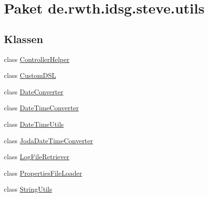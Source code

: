 \hypertarget{namespacede_1_1rwth_1_1idsg_1_1steve_1_1utils}{\section{Paket de.\-rwth.\-idsg.\-steve.\-utils}
\label{namespacede_1_1rwth_1_1idsg_1_1steve_1_1utils}
}
\subsection*{Klassen}
\begin{DoxyCompactItemize}
\item 
class \hyperlink{classde_1_1rwth_1_1idsg_1_1steve_1_1utils_1_1_controller_helper}{Controller\-Helper}
\item 
class \hyperlink{classde_1_1rwth_1_1idsg_1_1steve_1_1utils_1_1_custom_d_s_l}{Custom\-D\-S\-L}
\item 
class \hyperlink{classde_1_1rwth_1_1idsg_1_1steve_1_1utils_1_1_date_converter}{Date\-Converter}
\item 
class \hyperlink{classde_1_1rwth_1_1idsg_1_1steve_1_1utils_1_1_date_time_converter}{Date\-Time\-Converter}
\item 
class \hyperlink{classde_1_1rwth_1_1idsg_1_1steve_1_1utils_1_1_date_time_utils}{Date\-Time\-Utils}
\item 
class \hyperlink{classde_1_1rwth_1_1idsg_1_1steve_1_1utils_1_1_joda_date_time_converter}{Joda\-Date\-Time\-Converter}
\item 
class \hyperlink{classde_1_1rwth_1_1idsg_1_1steve_1_1utils_1_1_log_file_retriever}{Log\-File\-Retriever}
\item 
class \hyperlink{classde_1_1rwth_1_1idsg_1_1steve_1_1utils_1_1_properties_file_loader}{Properties\-File\-Loader}
\item 
class \hyperlink{classde_1_1rwth_1_1idsg_1_1steve_1_1utils_1_1_string_utils}{String\-Utils}
\end{DoxyCompactItemize}
